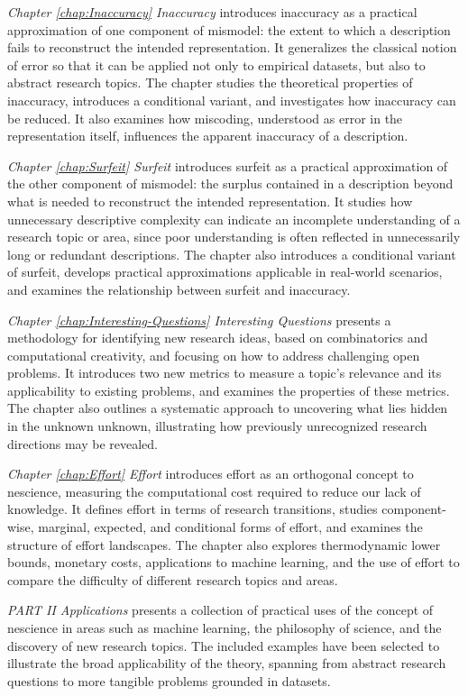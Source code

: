 \emph{Chapter \ref{chap:Inaccuracy} Inaccuracy} introduces inaccuracy as a practical approximation of one component of mismodel: the extent to which a description fails to reconstruct the intended representation. It generalizes the classical notion of error so that it can be applied not only to empirical datasets, but also to abstract research topics. The chapter studies the theoretical properties of inaccuracy, introduces a conditional variant, and investigates how inaccuracy can be reduced. It also examines how miscoding, understood as error in the representation itself, influences the apparent inaccuracy of a description.

\emph{Chapter \ref{chap:Surfeit} Surfeit} introduces surfeit as a practical approximation of the other component of mismodel: the surplus contained in a description beyond what is needed to reconstruct the intended representation. It studies how unnecessary descriptive complexity can indicate an incomplete understanding of a research topic or area, since poor understanding is often reflected in unnecessarily long or redundant descriptions. The chapter also introduces a conditional variant of surfeit, develops practical approximations applicable in real-world scenarios, and examines the relationship between surfeit and inaccuracy.

\emph{Chapter \ref{chap:Interesting-Questions} Interesting Questions} presents a methodology for identifying new research ideas, based on combinatorics and computational creativity, and focusing on how to address challenging open problems. It introduces two new metrics to measure a topic's relevance and its applicability to existing problems, and examines the properties of these metrics. The chapter also outlines a systematic approach to uncovering what lies hidden in the unknown unknown, illustrating how previously unrecognized research directions may be revealed.

\emph{Chapter \ref{chap:Effort} Effort} introduces effort as an orthogonal concept to nescience, measuring the computational cost required to reduce our lack of knowledge. It defines effort in terms of research transitions, studies component-wise, marginal, expected, and conditional forms of effort, and examines the structure of effort landscapes. The chapter also explores thermodynamic lower bounds, monetary costs, applications to machine learning, and the use of effort to compare the difficulty of different research topics and areas.

\emph{PART II Applications} presents a collection of practical uses of the concept of nescience in areas such as machine learning, the philosophy of science, and the discovery of new research topics. The included examples have been selected to illustrate the broad applicability of the theory, spanning from abstract research questions to more tangible problems grounded in datasets.

